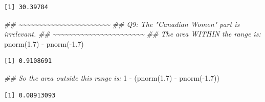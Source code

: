 \documentclass[
  letterpaper,
  DIV=11,
  numbers=noendperiod,
  oneside]{scrreprt}
\newenvironment{Shaded}{\begin{snugshade}}{\end{snugshade}}
\newcommand{\DecValTok}[1]{\textcolor[rgb]{0.68,0.00,0.00}{#1}}
\newcommand{\DocumentationTok}[1]{\textcolor[rgb]{0.37,0.37,0.37}{\textit{#1}}}
\newcommand{\FloatTok}[1]{\textcolor[rgb]{0.68,0.00,0.00}{#1}}
\newcommand{\FunctionTok}[1]{\textcolor[rgb]{0.28,0.35,0.67}{#1}}
\newcommand{\NormalTok}[1]{\textcolor[rgb]{0.00,0.23,0.31}{#1}}
\newcommand{\SpecialCharTok}[1]{\textcolor[rgb]{0.37,0.37,0.37}{#1}}
\begin{document}
\begin{verbatim}
[1] 30.39784
\end{verbatim}

\begin{Shaded}
\begin{Highlighting}[]
\DocumentationTok{\#\# \textasciitilde{}\textasciitilde{}\textasciitilde{}\textasciitilde{}\textasciitilde{}\textasciitilde{}\textasciitilde{}\textasciitilde{}\textasciitilde{}\textasciitilde{}\textasciitilde{}\textasciitilde{}\textasciitilde{}\textasciitilde{}\textasciitilde{}\textasciitilde{}\textasciitilde{}\textasciitilde{}\textasciitilde{}\textasciitilde{}\textasciitilde{}\textasciitilde{}\textasciitilde{}}
\DocumentationTok{\#\# Q9: The "Canadian Women" part is irrelevant.}
\DocumentationTok{\#\# \textasciitilde{}\textasciitilde{}\textasciitilde{}\textasciitilde{}\textasciitilde{}\textasciitilde{}\textasciitilde{}\textasciitilde{}\textasciitilde{}\textasciitilde{}\textasciitilde{}\textasciitilde{}\textasciitilde{}\textasciitilde{}\textasciitilde{}\textasciitilde{}\textasciitilde{}\textasciitilde{}\textasciitilde{}\textasciitilde{}\textasciitilde{}\textasciitilde{}\textasciitilde{}}
\DocumentationTok{\#\# The area WITHIN the range is:}
\FunctionTok{pnorm}\NormalTok{(}\FloatTok{1.7}\NormalTok{) }\SpecialCharTok{{-}} \FunctionTok{pnorm}\NormalTok{(}\SpecialCharTok{{-}}\FloatTok{1.7}\NormalTok{)}
\end{Highlighting}
\end{Shaded}

\begin{verbatim}
[1] 0.9108691
\end{verbatim}

\begin{Shaded}
\begin{Highlighting}[]
\DocumentationTok{\#\# So the area outside this range is:}
\DecValTok{1} \SpecialCharTok{{-}}\NormalTok{ (}\FunctionTok{pnorm}\NormalTok{(}\FloatTok{1.7}\NormalTok{) }\SpecialCharTok{{-}} \FunctionTok{pnorm}\NormalTok{(}\SpecialCharTok{{-}}\FloatTok{1.7}\NormalTok{))}
\end{Highlighting}
\end{Shaded}

\begin{verbatim}
[1] 0.08913093
\end{verbatim}
\end{document}
